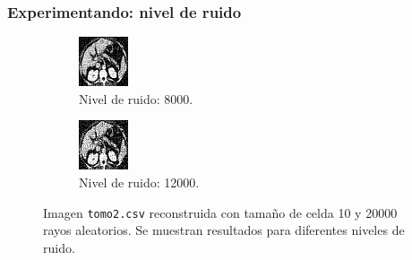 \documentclass{beamer}
\begin{document}
\begin{frame}
\frametitle{Experimentando: nivel de ruido}

\begin{figure}
\centering
\begin{subfigure}{0.49\textwidth}
  \centering
  \includegraphics[width=0.6\linewidth]{ruido/tomo2-ruido8000}
  \caption{Nivel de ruido: 8000.}
\end{subfigure}
\begin{subfigure}{0.49\textwidth}
  \centering
  \includegraphics[width=0.6\linewidth]{ruido/tomo2-ruido12000}
  \caption{Nivel de ruido: 12000.}
\end{subfigure}
\caption{Imagen \texttt{tomo2.csv} reconstruida con tamaño de celda 10 y 20000 rayos aleatorios. Se 
muestran resultados para diferentes niveles de ruido.}
\label{fig:muestras_ruido}
\end{figure}

\end{frame}
\end{document}
